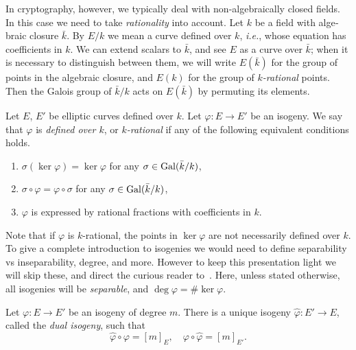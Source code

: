 \begin{otherlanguage}{english}
  In cryptography, however, we typically deal with non-algebraically
  closed fields. In this case we need to take \emph{rationality} into
  account. Let $k$ be a field with algebraic closure $\bar{k}$. By
  $E/k$ we mean a curve defined over $k$, \emph{i.e.}, whose equation
  has coefficients in $k$. We can extend scalars to $\bar{k}$, and see
  $E$ as a curve over $\bar{k}$; when it is necessary to distinguish
  between them, we will write $E(\bar{k})$ for the group of points in
  the algebraic closure, and $E(k)$ for the group of
  \emph{$k$-rational} points.  Then the Galois group of $\bar{k}/k$
  acts on $E(\bar{k})$ by permuting its elements.

  \begin{definition}
    Let $E$, $E'$ be elliptic curves defined over $k$. Let
    $\varphi:E\to E'$ be an isogeny. We say that $\varphi$ is
    \emph{defined over $k$}, or \emph{$k$-rational} if any of the
    following equivalent conditions holds.
    \begin{enumerate}
    \item $\sigma(\ker\varphi) = \ker\varphi$ for any
      $\sigma\in\mathrm{Gal}(\bar{k}/k)$,
    \item $\sigma\circ\varphi = \varphi\circ\sigma$ for any
      $\sigma\in\mathrm{Gal}(\bar{k}/k)$,
    \item $\varphi$ is expressed by rational fractions with
      coefficients in $k$.
    \end{enumerate}
  \end{definition}

  Note that if $\varphi$ is $k$-rational, the points in $\ker\varphi$
  are not necessarily defined over $k$. To give a complete
  introduction to isogenies we would need to define separability vs
  inseparability, degree, and more. However to keep this presentation
  light we will skip these, and direct the curious reader
  to~\cite{silverman:elliptic,milne2006,defeo2017isogenybased}.  Here,
  unless stated otherwise, all isogenies will be \emph{separable}, and
  $\deg\varphi=\#\ker\varphi$.

  \begin{theorem}
    Let $\varphi:E\to E'$ be an isogeny of degree $m$. %
    There is a unique isogeny $\hat{\varphi}:E'\to E$, called the
    \emph{dual isogeny}, such that
    \[\hat{\varphi}\circ\varphi = [m]_E, \quad \varphi\circ\hat{\varphi} = [m]_{E'}.\] %
  \end{theorem}


\end{otherlanguage}
